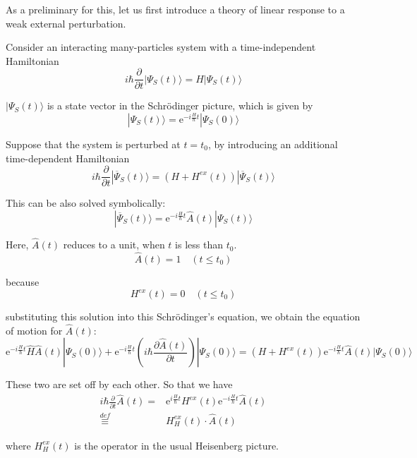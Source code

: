 As a preliminary for this, let us first introduce a theory of linear response to a weak external perturbation.

Consider an interacting many-particles system with a time-independent Hamiltonian
\[ i \hbar \frac{\partial}{\partial t} | \Psi_S(t) \rangle = H | \Psi_S (t) \rangle \]

$| \Psi_S (t) \rangle$ is a state vector in the Schr\"odinger picture, which is given by
\[| \Psi_S (t) \rangle = \mathrm{e}^{-i\frac{H}{\hbar}t}| \Psi_S (0) \rangle\]

Suppose that the system is perturbed at $t=t_0$, by introducing an additional time-dependent Hamiltonian
\begin{equation} \label{Eqs3.1.1}
i \hbar \frac{\partial}{\partial t} | \overline{\Psi}_S(t) \rangle = (H + H^{ex}(t))| \overline{\Psi}_S(t) \rangle
\end{equation}

This can be also solved symbolically:
\begin{equation} \label{Eqs3.1.2}
| \overline{\Psi}_S(t) \rangle = \mathrm{e}^{-i \frac{H}{\hbar}t}\hat{A}(t)  |\Psi_S(t) \rangle
\end{equation}

Here, $\hat{A}(t)$ reduces to a unit, when $t$ is less than $t_0$.
\begin{equation} \label{Eqs3.1.3}
\hat{A}(t) = 1 \quad (t \leq t_0)
\end{equation}

because
\[ H^{ex}(t) = 0 \quad (t \leq t_0) \]

substituting this solution into this Schr\"odinger's equation, we obtain the equation of motion for $\hat{A}(t)$:
\[ \mathrm{e}^{-i\frac{H}{\hbar}t}\hat{H}\hat{A}(t)|\Psi_S(0)\rangle + \mathrm{e}^{-i\frac{H}{\hbar}t}(i\hbar\frac{\partial \hat{A}(t)}{\partial t})|\Psi_S(0)\rangle = (H + H^{ex}(t))\mathrm{e}^{-i\frac{H}{\hbar}t}\hat{A}(t)|\Psi_S(0)\rangle \]

These two are set off by each other. So that we have
\begin{equation} \label{Eqs3.1.4} \begin{split}
i \hbar \frac{\partial}{\partial t}\hat{A}(t) =& \mathrm{e}^{i\frac{H}{\hbar}t}H^{ex}(t)\mathrm{e}^{-i\frac{H}{\hbar}t}\hat{A}(t)\\
\overset{def}{\equiv}& H_H^{ex}(t) \cdot \hat{A}(t)
\end{split}\end{equation}

where $H_H^{ex}(t)$ is the operator in the usual Heisenberg picture.

